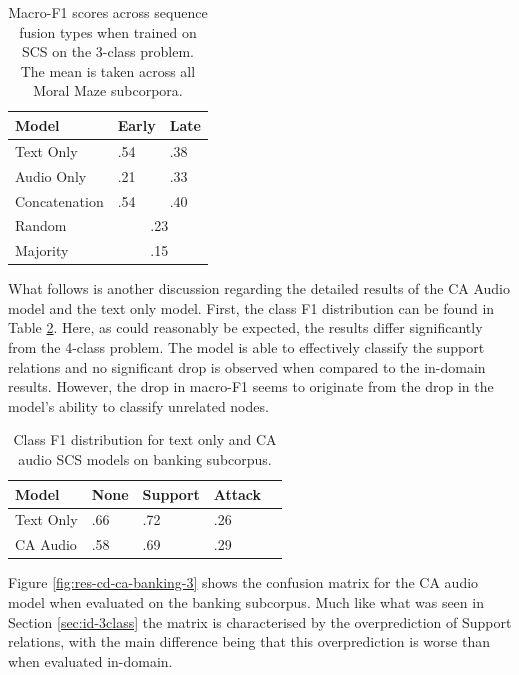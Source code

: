 \documentclass[twocolumn]{article}
\begin{document}
\begin{table}[H]
\centering
\caption{Macro-F1 scores across sequence fusion types when trained on SCS on the 3-class problem. The mean is taken across all Moral Maze subcorpora. \label{tbl:results-seq-3class-cd}}
\begin{tabular}{|l|ll|}
\hline
Model         & Early       & Late      \\ \hline
Text Only     & .54         & .38    \\
Audio Only    & .21         & .33    \\
Concatenation & .54         & .40    \\ \hline
Random        & \multicolumn{2}{c|}{.23} \\
Majority      & \multicolumn{2}{c|}{.15} \\ \hline
\end{tabular}
\end{table}

What follows is another discussion regarding the detailed results of the
CA Audio model and the text only model. First, the class F1 distribution
can be found in Table \ref{tbl:class-f1-3class-banking}. Here, as could
reasonably be expected, the results differ significantly from the
4-class problem. The model is able to effectively classify the support
relations and no significant drop is observed when compared to the
in-domain results. However, the drop in macro-F1 seems to originate from
the drop in the model's ability to classify unrelated nodes.

\begin{table}[H]
\centering
\caption{Class F1 distribution for text only and CA audio SCS models on banking subcorpus.\label{tbl:class-f1-3class-banking}}
\begin{tabular}{|l|llll|}
\hline
Model     & None & Support & \multicolumn{1}{l|}{Attack} \\ \hline
Text Only & .66           & .72              & \multicolumn{1}{l|}{.26}         \\
CA Audio  & .58           & .69              & \multicolumn{1}{l|}{.29}         \\ \hline
\end{tabular}
\end{table}

Figure \ref{fig:res-cd-ca-banking-3} shows the confusion matrix for the
CA audio model when evaluated on the banking subcorpus. Much like what
was seen in Section \ref{sec:id-3class} the matrix is characterised by
the overprediction of Support relations, with the main difference being
that this overprediction is worse than when evaluated in-domain.
\end{document}

